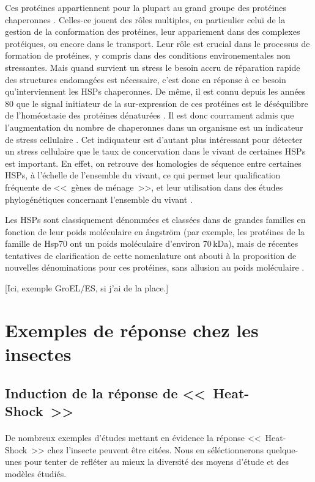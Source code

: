 	Ces protéines appartiennent pour la plupart au grand groupe des protéines chaperonnes \cite{federhoffmann1999}.
	Celles-ce jouent des rôles multiples, en particulier celui de la gestion de la conformation des protéines, leur appariement dans des complexes protéiques, ou encore dans le transport.
	Leur rôle est crucial dans le processus de formation de protéines, y compris dans des conditions environementales non stressantes.
	Mais quand survient un stress le besoin accru de réparation rapide des structures endomagées est nécessaire, c'est donc en réponse à ce besoin qu'interviennent les HSPs chaperonnes.
	De même, il est connu depuis les années 80 que le signal initiateur de la sur-expression de ces protéines est le déséquilibre de l'homéostasie des protéines dénaturées \cite{ananthan1986}.
	Il est donc courrament admis que l'augmentation du nombre de chaperonnes dans un organisme est un indicateur de stress cellulaire \cite{ryan1996}.
	Cet indiquateur est d'autant plus intéressant pour détecter un stress cellulaire que le taux de concervation dans le vivant de certaines HSPs est important.
	En effet, on retrouve des homologies de séquence entre certaines HSPs, à l'échelle de l'ensemble du vivant, ce qui permet leur qualification fréquente de <<~gènes de ménage~>>, et leur utilisation dans des études phylogénétiques concernant l'ensemble du vivant \cite{gupta1995}.

	Les HSPs sont classiquement dénommées et classées dans de grandes familles en fonction de leur poids moléculaire en ångström (par exemple, les protéines de la famille de Hsp70 ont un poids moléculaire d'environ 70\,kDa), mais de récentes tentatives de clarification de cette nomenlature ont abouti à la proposition de nouvelles dénominations pour ces protéines, sans allusion au poids moléculaire \cite{kampinga2009}.

	[Ici, exemple GroEL/ES, si j'ai de la place.]

	\section{Exemples de réponse chez les insectes}

		\subsection{Induction de la réponse de <<~Heat-Shock~>>}

		\paragraph{}
		De nombreux exemples d'études mettant en évidence la réponse <<~Heat-Shock~>> chez l'insecte peuvent être citées.
		Nous en séléctionnerons quelque-unes pour tenter de refléter au mieux la diversité des moyens d'étude et des modèles étudiés.


